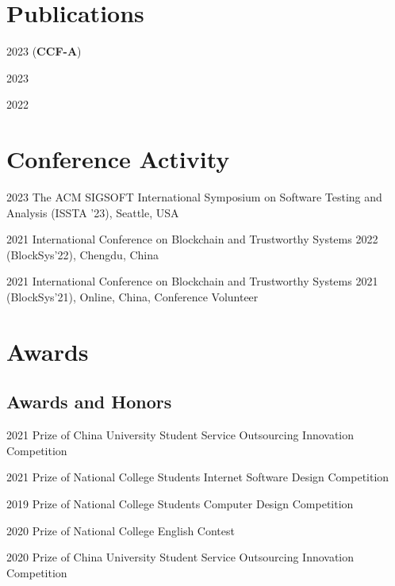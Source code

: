 \documentclass[12pt,letterpaper]{report}
\begin{document}
    \section*{Publications}
    \begin{tablist}
        \item[2023] \tab{} (\textbf{CCF-A})
        \item[2023] \tab{}
        \item[2022] \tab{}
    \end{tablist}


    \section*{Conference Activity}
    \begin{tablist}
        \item[2023] \tab{}The ACM SIGSOFT International Symposium on Software Testing and Analysis (ISSTA '23), Seattle, USA
        \item[2021] \tab{}International Conference on Blockchain and Trustworthy Systems 2022 (BlockSys'22), Chengdu, China
        \item[2021] \tab{}International Conference on Blockchain and Trustworthy Systems 2021 (BlockSys'21), Online, China, Conference Volunteer
    \end{tablist}

    \section*{Awards}
    \subsection*{Awards and Honors}
    \begin{tablist}
        \item[2021] \tab{} Prize of China University Student Service Outsourcing Innovation Competition
        \item[2021] \tab{} Prize of National College Students Internet Software Design Competition
        \item[2019] \tab{} Prize of National College Students Computer Design Competition
        \item[2020] \tab{} Prize of National College English Contest
        \item[2020] \tab{} Prize of China University Student Service Outsourcing Innovation Competition
    \end{tablist}
\end{document}

